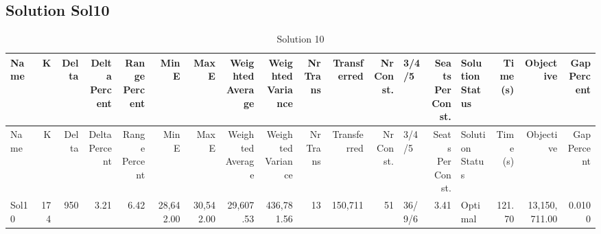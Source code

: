 \documentclass[a4paper]{article}
\begin{document}
\clearpage
\subsection{Solution Sol10}

{\scriptsize
\begin{longtable}{lrrrrrrrrrrrlrlrrr}
\caption{Solution 10}
\\ \toprule
Name &K &Delta &\shortstack{Delta\\Percent} &\shortstack{Range\\Percent} &Min E &Max E &\shortstack{Weighted\\Average} &\shortstack{Weighted\\Variance} &\shortstack{Nr\\Trans} &Transferred &\shortstack{Nr\\Const.} &3/4/5 &\shortstack{Seats\\Per\\Const.} &\shortstack{Solution\\Status} &\shortstack{Time\\(s)} &Objective &\shortstack{Gap\\Percent} \\ \midrule
\endfirsthead
\toprule
Name &K &Delta &\shortstack{Delta\\Percent} &\shortstack{Range\\Percent} &Min E &Max E &\shortstack{Weighted\\Average} &\shortstack{Weighted\\Variance} &\shortstack{Nr\\Trans} &Transferred &\shortstack{Nr\\Const.} &3/4/5 &\shortstack{Seats\\Per\\Const.} &\shortstack{Solution\\Status} &\shortstack{Time\\(s)} &Objective &\shortstack{Gap\\Percent} \\ \midrule
\endhead
\bottomrule
\endfoot
Sol10&174&950& 3.21& 6.42&28,642.00&30,542.00&29,607.53&436,781.56&13&150,711&51&36/9/6& 3.41&Optimal&121.70&13,150,711.00&0.0100\\ 
\end{longtable}

}
\end{document}
